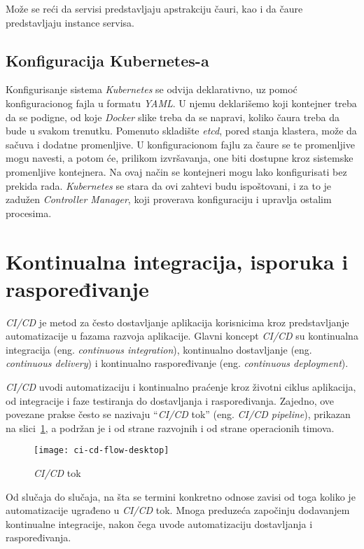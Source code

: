 Može se reći da servisi predstavljaju apstrakciju čauri, kao i da čaure predstavljaju instance servisa.

\subsection{Konfiguracija Kubernetes-a}
Konfigurisanje sistema \textit{Kubernetes} se odvija deklarativno, uz pomoć konfiguracionog fajla u formatu \textit{YAML}. U njemu deklarišemo
koji kontejner treba da se podigne, od koje \textit{Docker} slike treba da se napravi, koliko čaura treba 
da bude u svakom trenutku. Pomenuto skladište {\em etcd}, pored stanja klastera, može da sačuva i dodatne promenljive.
U konfiguracionom fajlu za čaure se te promenljive mogu navesti, a potom će, prilikom izvršavanja, one biti 
dostupne kroz sistemske promenljive kontejnera. Na ovaj način se kontejneri mogu lako konfigurisati bez prekida rada. 
\textit{Kubernetes} se stara da ovi zahtevi budu ispoštovani, i za to je zadužen \textit{Controller Manager}, 
koji proverava konfiguraciju i upravlja ostalim procesima. 


\section{Kontinualna integracija, isporuka i raspoređivanje}\label{sec:arhitektura-ci_cd}

\textit{CI/CD} je metod za često dostavljanje aplikacija korisnicima kroz predstavljanje automatizacije u 
fazama razvoja aplikacije. Glavni koncept \textit{CI/CD} su kontinualna integracija (eng. 
\textit{continuous integration}), kontinualno dostavljanje (eng. \textit{continuous delivery}) i 
kontinualno raspoređivanje (eng. \textit{continuous deployment}).

\textit{CI/CD} uvodi automatizaciju i kontinualno praćenje kroz životni ciklus aplikacija, 
od integracije i faze testiranja do dostavljanja i raspoređivanja. Zajedno, ove povezane prakse 
često se nazivaju “\textit{CI/CD} tok” (eng. \textit{CI/CD pipeline}), prikazan na slici~\ref{fig:cicd}, 
a podržan je i od strane razvojnih i od strane operacionih timova.

\begin{figure}[h]
    \centering
    \texttt{[image: ci-cd-flow-desktop]}
    \caption{\textit{CI/CD} tok}
    \label{fig:cicd}
\end{figure}

Od slučaja do slučaja, na šta se termini konkretno odnose zavisi od toga koliko je automatizacije 
ugrađeno u \textit{CI/CD} tok. Mnoga preduzeća započinju dodavanjem kontinualne integracije, 
nakon čega uvode automatizaciju dostavljanja i raspoređivanja.

